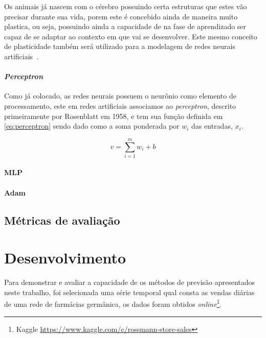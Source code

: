 \documentclass[
    12pt,
    oneside,
    a4paper,
    english,
    brazil
]{abntex2}
\begin{document}
Os animais já nascem com o cérebro possuindo certa estruturas que estes vão
precisar durante sua vida, porem este é concebido ainda de maneira muito
plastica, ou seja, possuindo ainda a capacidade de na fase de aprendizado ser
capaz de se adaptar ao contexto em que vai se desenvolver. Este mesmo conceito
de plasticidade também será utilizado para a modelagem de redes neurais
artificiais~\cite{haykin}.

\subsubsection{\textit{Perceptron}}

Como já colocado, as redes neurais possuem o neurônio como elemento de
processamento, este em redes artificiais associamos ao \textit{perceptron},
descrito primeiramente por Rosenblatt em 1958, e tem sua função definida em
\autoref{eq:perceptron} sendo dado como a soma ponderada por $w_i$ das
entradas, $x_i$.

\begin{equation}
    \label{eq:perceptron}
    v = \sum_{i=1}^{m}{w_i + b}
\end{equation}


\subsubsection{MLP}

\subsubsection{Adam}

\section{Métricas de avaliação}

\chapter{Desenvolvimento}\label{chap:desenv}

Para demonstrar e avaliar a capacidade de os métodos de previsão apresentados
neste trabalho, foi selecionada uma série temporal qual consta as vendas
diárias de uma rede de farmácias germânica, os dados foram obtidos
\textit{online}\footnote{Kaggle
    \url{https://www.kaggle.com/c/rossmann-store-sales}}.
\end{document}
